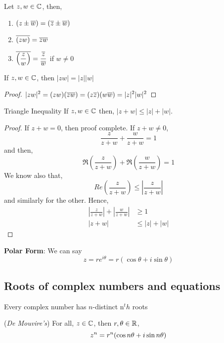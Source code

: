 \documentclass{article}
\begin{document}
\begin{nlemma}
  Let $\displaystyle{z, w \in \mathbb{C}}$, then,
  \begin{enumerate}
    \item $(z \pm \overline{w}) = (\overline{z} \pm \overline{w})$
    \item $\overline{(zw)} = \overline{z} \overline{w}$
    \item $\displaystyle{\overline{ \left(\frac{z}{w}\right) } = \frac{\overline{z}}{\overline{w}}}$ \qquad if $w \neq 0$
  \end{enumerate}
\end{nlemma}

\begin{ncor}
  If $z, w \in \mathbb{C}$, then $\displaystyle{|zw| = |z||w|}$
\end{ncor}
\begin{proof}
  $\displaystyle{|zw|^2 = (zw)(\overline{z}\overline{w}) = (z\overline{z})(w\overline{w}) = |z|^2|w|^2}$
\end{proof}
\begin{ncor}{Triangle Inequality}
  If $\displaystyle{z, w \in \mathbb{C}}$ then, $\displaystyle{|z+w| \le |z| + |w|}$.
\end{ncor}
\begin{proof}
  If $z + w = 0$, then proof complete. If $\displaystyle{z + w \neq 0}$,
  $$ \frac{z}{z+w} + \frac{w}{z + w} = 1 $$
  and then,
  $$ \Re\left( \frac{z}{z+w}\right) + \Re\left(\frac{w}{z + w}\right) = 1 $$
  We know also that,
  $$ Re\left( \frac{z}{z + w} \right) \le |\frac{z}{z+w}| $$
  and similarly for the other. Hence,
  \begin{align*}
    \left|\frac{z}{z + w}\right| + \left|\frac{w}{z + w}\right| &\ge 1\\
    |z + w| &\le |z| + |w|
  \end{align*}
\end{proof}
\textbf{Polar Form}: We can say $$ z = re^{i\theta} = r(\cos \theta  + i\sin\theta) $$

\subsection{Roots of complex numbers and equations}

\begin{nlemma}
  Every complex number has $n$-distinct n$^th$ roots
\end{nlemma}

\begin{nthm}{(\textit{De Mouvire's})}
  For all, $z \in \mathbb{C}$, then $r, \theta \in \mathbb{R}$,
  $$ z^n = r^n (\cos n\theta + i\sin n\theta) $$
\end{nthm}
\end{document}
